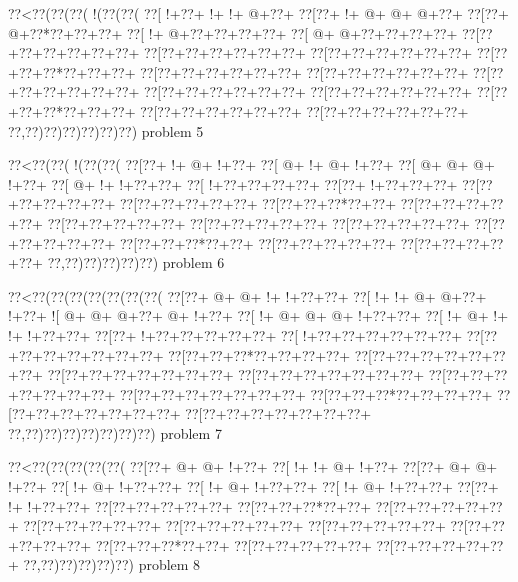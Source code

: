 \vbox{\vbox{\goo
\0??<\0??(\0??(\0??(\- !(\0??(\0??(
\0??[\- !+\0??+\- !+\- !+\- @+\0??+
\0??[\0??+\- !+\- @+\- @+\- @+\0??+
\0??[\0??+\- @+\0??*\0??+\0??+\0??+
\0??[\- !+\- @+\0??+\0??+\0??+\0??+
\0??[\- @+\- @+\0??+\0??+\0??+\0??+
\0??[\0??+\0??+\0??+\0??+\0??+\0??+
\0??[\0??+\0??+\0??+\0??+\0??+\0??+
\0??[\0??+\0??+\0??+\0??+\0??+\0??+
\0??[\0??+\0??+\0??*\0??+\0??+\0??+
\0??[\0??+\0??+\0??+\0??+\0??+\0??+
\0??[\0??+\0??+\0??+\0??+\0??+\0??+
\0??[\0??+\0??+\0??+\0??+\0??+\0??+
\0??[\0??+\0??+\0??+\0??+\0??+\0??+
\0??[\0??+\0??+\0??+\0??+\0??+\0??+
\0??[\0??+\0??+\0??*\0??+\0??+\0??+
\0??[\0??+\0??+\0??+\0??+\0??+\0??+
\0??[\0??+\0??+\0??+\0??+\0??+\0??+
\0??,\0??)\0??)\0??)\0??)\0??)\0??)
}
\hfil problem 5\hfil\break
}

\vbox{\vbox{\goo
\0??<\0??(\0??(\- !(\0??(\0??(
\0??[\0??+\- !+\- @+\- !+\0??+
\0??[\- @+\- !+\- @+\- !+\0??+
\0??[\- @+\- @+\- @+\- !+\0??+
\0??[\- @+\- !+\- !+\0??+\0??+
\0??[\- !+\0??+\0??+\0??+\0??+
\0??[\0??+\- !+\0??+\0??+\0??+
\0??[\0??+\0??+\0??+\0??+\0??+
\0??[\0??+\0??+\0??+\0??+\0??+
\0??[\0??+\0??+\0??*\0??+\0??+
\0??[\0??+\0??+\0??+\0??+\0??+
\0??[\0??+\0??+\0??+\0??+\0??+
\0??[\0??+\0??+\0??+\0??+\0??+
\0??[\0??+\0??+\0??+\0??+\0??+
\0??[\0??+\0??+\0??+\0??+\0??+
\0??[\0??+\0??+\0??*\0??+\0??+
\0??[\0??+\0??+\0??+\0??+\0??+
\0??[\0??+\0??+\0??+\0??+\0??+
\0??,\0??)\0??)\0??)\0??)\0??)
}
\hfil problem 6\hfil\break
}

\vbox{\vbox{\goo
\0??<\0??(\0??(\0??(\0??(\0??(\0??(\0??(
\0??[\0??+\- @+\- @+\- !+\- !+\0??+\0??+
\0??[\- !+\- !+\- @+\- @+\0??+\- !+\0??+
\- ![\- @+\- @+\- @+\0??+\- @+\- !+\0??+
\0??[\- !+\- @+\- @+\- @+\- !+\0??+\0??+
\0??[\- !+\- @+\- !+\- !+\- !+\0??+\0??+
\0??[\0??+\- !+\0??+\0??+\0??+\0??+\0??+
\0??[\- !+\0??+\0??+\0??+\0??+\0??+\0??+
\0??[\0??+\0??+\0??+\0??+\0??+\0??+\0??+
\0??[\0??+\0??+\0??*\0??+\0??+\0??+\0??+
\0??[\0??+\0??+\0??+\0??+\0??+\0??+\0??+
\0??[\0??+\0??+\0??+\0??+\0??+\0??+\0??+
\0??[\0??+\0??+\0??+\0??+\0??+\0??+\0??+
\0??[\0??+\0??+\0??+\0??+\0??+\0??+\0??+
\0??[\0??+\0??+\0??+\0??+\0??+\0??+\0??+
\0??[\0??+\0??+\0??*\0??+\0??+\0??+\0??+
\0??[\0??+\0??+\0??+\0??+\0??+\0??+\0??+
\0??[\0??+\0??+\0??+\0??+\0??+\0??+\0??+
\0??,\0??)\0??)\0??)\0??)\0??)\0??)\0??)
}
\hfil problem 7\hfil\break
}

\vbox{\vbox{\goo
\0??<\0??(\0??(\0??(\0??(\0??(
\0??[\0??+\- @+\- @+\- !+\0??+
\0??[\- !+\- !+\- @+\- !+\0??+
\0??[\0??+\- @+\- @+\- !+\0??+
\0??[\- !+\- @+\- !+\0??+\0??+
\0??[\- !+\- @+\- !+\0??+\0??+
\0??[\- !+\- @+\- !+\0??+\0??+
\0??[\0??+\- !+\- !+\0??+\0??+
\0??[\0??+\0??+\0??+\0??+\0??+
\0??[\0??+\0??+\0??*\0??+\0??+
\0??[\0??+\0??+\0??+\0??+\0??+
\0??[\0??+\0??+\0??+\0??+\0??+
\0??[\0??+\0??+\0??+\0??+\0??+
\0??[\0??+\0??+\0??+\0??+\0??+
\0??[\0??+\0??+\0??+\0??+\0??+
\0??[\0??+\0??+\0??*\0??+\0??+
\0??[\0??+\0??+\0??+\0??+\0??+
\0??[\0??+\0??+\0??+\0??+\0??+
\0??,\0??)\0??)\0??)\0??)\0??)
}
\hfil problem 8\hfil\break
}

